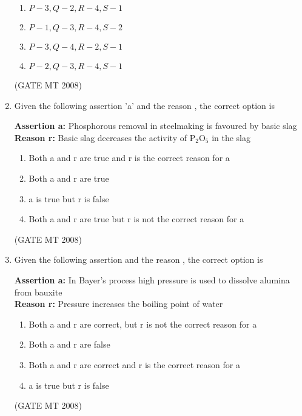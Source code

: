 \documentclass[11pt, letterpaper]{article}
\theoremstyle{remark}
\begin{document}
\begin{enumerate}
\begin{multicols}{2}
\begin{enumerate} 
\item $P-3, Q-2, R-4, S-1$
\item $P-1, Q-3, R-4, S-2$
\item $P-3, Q-4, R-2, S-1$
\item $P-2, Q-3, R-4, S-1$
\end{enumerate}
\end{multicols}
\hfill(GATE MT 2008)

\item Given the following assertion 'a' and the reason , the correct option is

\textbf{Assertion a:} Phosphorous removal in steelmaking is favoured by basic slag \\
\textbf{Reason r:} Basic slag decreases the activity of P$_2$O$_5$ in the slag

\begin{multicols}{2}
\begin{enumerate} 
\item Both a and r are true and r is the correct reason for a
\item Both a and r are true
\item a is true but r is false
\item Both a and r are true but r is not the correct reason for a
\end{enumerate}
\end{multicols}
\hfill(GATE MT 2008)
\item Given the following assertion  and the reason , the correct option is

\textbf{Assertion a:} In Bayer's process high pressure is used to dissolve alumina from bauxite \\
\textbf{Reason r:} Pressure increases the boiling point of water

\begin{multicols}{2}
\begin{enumerate} 
\item Both a and r are correct, but r is not the correct reason for a
\item Both a and r are false
\item Both a and r are correct and r is the correct reason for a
\item a is true but r is false
\end{enumerate}
\end{multicols}
\hfill(GATE MT 2008) 


\end{enumerate}
\end{document}
